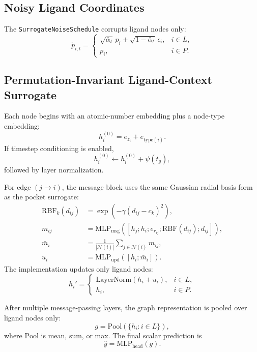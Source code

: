 \documentclass[11pt]{article}
\begin{document}
\subsection{Noisy Ligand Coordinates}
The \texttt{SurrogateNoiseSchedule} corrupts ligand nodes only:
\begin{equation}
\tilde{p}_{i,t}
=
\begin{cases}
\sqrt{\bar{\alpha}_t}\,p_i + \sqrt{1-\bar{\alpha}_t}\,\epsilon_i, & i \in L, \\
p_i, & i \in P.
\end{cases}
\end{equation}

\subsection{Permutation-Invariant Ligand-Context Surrogate}
Each node begins with an atomic-number embedding plus a node-type embedding:
\begin{equation}
h_i^{(0)} = e_{z_i} + e_{\mathrm{type}(i)}.
\end{equation}
If timestep conditioning is enabled,
\begin{equation}
h_i^{(0)} \leftarrow h_i^{(0)} + \psi(t_g),
\end{equation}
followed by layer normalization.

For edge $(j \to i)$, the message block uses the same Gaussian radial basis form as the pocket surrogate:
\begin{align}
\mathrm{RBF}_k(d_{ij})
&=
\exp\!\left(-\gamma(d_{ij}-c_k)^2\right), \\
m_{ij}
&=
\mathrm{MLP}_{\mathrm{msg}}
\left(
[h_j ; h_i ; e_{r_{ij}} ; \mathrm{RBF}(d_{ij}) ; d_{ij}]
\right), \\
\bar{m}_i
&=
\frac{1}{|\mathcal{N}(i)|}
\sum_{j \in \mathcal{N}(i)} m_{ij}, \\
u_i
&=
\mathrm{MLP}_{\mathrm{upd}}([h_i ; \bar{m}_i]).
\end{align}
The implementation updates only ligand nodes:
\begin{equation}
h_i' =
\begin{cases}
\mathrm{LayerNorm}(h_i + u_i), & i \in L, \\
h_i, & i \in P.
\end{cases}
\end{equation}

After multiple message-passing layers, the graph representation is pooled over ligand nodes only:
\begin{equation}
g =
\mathrm{Pool}\left(\{h_i : i \in L\}\right),
\end{equation}
where $\mathrm{Pool}$ is mean, sum, or max. The final scalar prediction is
\begin{equation}
\hat{y} = \mathrm{MLP}_{\mathrm{head}}(g).
\end{equation}
\end{document}

